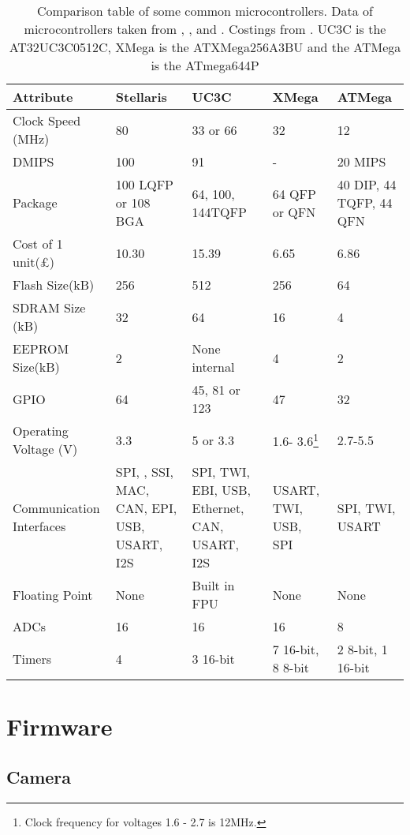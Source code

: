 \begin{table}
\caption{Comparison table of some common microcontrollers. Data of microcontrollers taken from \cite{Atmel:UC3C}, \cite{Atmel:644P}, \cite{Atmel:A3BU} and \cite{ARM:Stellaris}. Costings from \cite{Farnell}. UC3C is the AT32UC3C0512C, XMega is the ATXMega256A3BU and the ATMega is the ATmega644P}
\label{tab:uCComp}
\centering
\begin{tabular}{p{2.5cm}p{2.5cm}p{3cm}p{2.3cm}p{2.4cm}}\toprule
\textbf{Attribute}				& 	\textbf{Stellaris}		&	\textbf{UC3C} 		&	\textbf{XMega}	&	\textbf{ATMega} 	\\	\toprule
Clock Speed	(MHz)		&	80					&	33 or 66			&	32			&	12			\\\midrule
DMIPS					&	100					&	91					&	-			&	20 MIPS		\\\midrule
Package					&	100 LQFP or 108 BGA	&	64, 100, 144TQFP	&	64 QFP or QFN & 40 DIP, 44 TQFP, 44 QFN \\\midrule
Cost of 1 unit(\pounds)	&	10.30				& 15.39 &	6.65	 & 6.86\\\midrule
Flash Size(kB)			&	256					&	512					&	256			&	64 \\\midrule
SDRAM Size (kB)			&	32					&	64					&	16			&	4	\\\midrule
EEPROM Size(kB)			&	2					&	None internal		&	4			&	2 	\\\midrule
GPIO					&	64					& 	45, 81 or 123		&	47			& 	32	\\\midrule
Operating Voltage (V)	&	3.3					& 	5	or 3.3			& 	1.6- 3.6\footnote{Clock frequency for voltages 1.6 - 2.7 is 12MHz.}		& 	2.7-5.5	\\\midrule
Communication Interfaces &	SPI, \itc, SSI, MAC, CAN, EPI, USB, USART, I2S	& SPI, TWI, EBI, USB, Ethernet, CAN, USART, I2S	&	USART, TWI, USB, SPI 		&	SPI, TWI, USART \\\midrule
Floating Point			&	None				&	Built in FPU		&	None		&	None		\\\midrule
ADCs					&	16					&	16					&	16			&	8			\\\midrule
Timers					&	4					&	3 16-bit			& 7 16-bit, 8 8-bit & 2 8-bit, 1 16-bit \\
\bottomrule
\end{tabular}
\end{table}

\section{Firmware}
\subsection{Camera}

